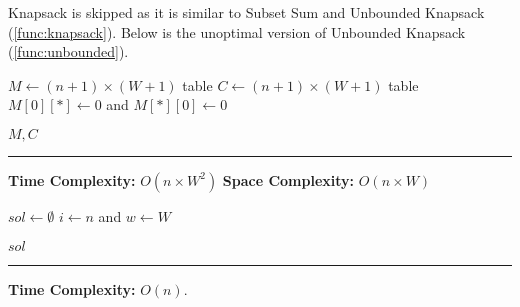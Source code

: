 \noindent
Knapsack is skipped as it is similar to Subset Sum and Unbounded Knapsack (\ref{func:knapsack}). Below is the unoptimal version of Unbounded Knapsack (\ref{func:unbounded}).
    \begin{Func}

        \vspace{-.5em}
        \begin{algorithm}[H]
            $M \gets (n+1) \times (W+1)$ table 
            $C \gets (n+1) \times (W+1)$ table 
            $M[0][*] \gets 0$ and $M[*][0] \gets 0$\;
            
            \Return $M, C$\;
        \end{algorithm}
        
        \noindent
        \rule{\textwidth}{0.4pt}
        \textbf{Time Complexity:} $O(n \times W^2)$ \textbf{Space Complexity:} $O(n \times W)$
    \end{Func}
    \begin{Func}

        \vspace{-.5em}
        \begin{algorithm}[H]
            $sol \gets \emptyset$\;
            $i \gets n$ and $w \gets W$\;
            
            
            \Return $sol$\;
        \end{algorithm}
        
        \noindent
        \rule{\textwidth}{0.4pt}
        \textbf{Time Complexity:} $O(n)$.
    \end{Func}
\newpage

